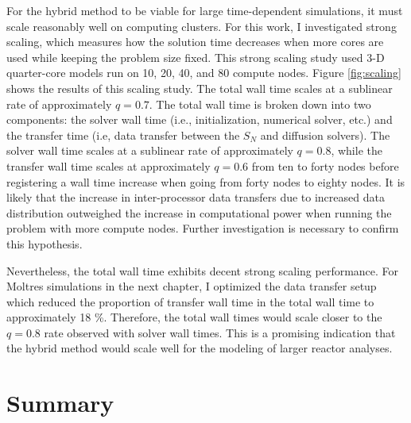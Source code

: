 For the hybrid method to be viable for large time-dependent simulations, it must scale reasonably
well on computing clusters. For this work, I investigated strong scaling, which measures how the
solution time decreases when more cores are used while keeping the problem size fixed. This strong
scaling study used 3-D quarter-core models run on 10, 20, 40, and 80 compute nodes.
Figure \ref{fig:scaling} shows the results of this scaling study. The total wall time scales at a
sublinear rate of approximately $q=0.7$. The total wall time is broken down into two components:
the solver wall time (i.e., initialization, numerical solver, etc.) and the transfer time (i.e,
data transfer between the $S_N$ and diffusion solvers). The solver wall time scales at a sublinear
rate of approximately $q=0.8$, while the transfer wall time scales at approximately $q=0.6$ from
ten to forty nodes before registering a wall time increase when going from forty nodes to eighty nodes.
It is likely that the increase in inter-processor data transfers due to increased data distribution
outweighed the increase in computational power when running the problem with more compute nodes.
Further investigation is necessary to confirm this hypothesis.

Nevertheless, the total wall time exhibits decent strong scaling performance. For Moltres
simulations in the next chapter, I optimized the data transfer setup which reduced the
proportion of transfer wall time in the total wall time to approximately 18 \%. Therefore, the total
wall times would scale closer to the $q=0.8$ rate observed with solver wall times.
This is a promising indication that the hybrid method would scale well for the modeling of larger
reactor analyses.

\FloatBarrier


\section{Summary}

